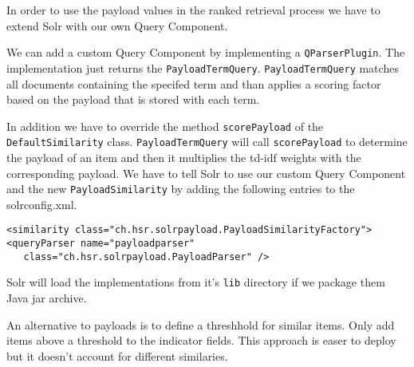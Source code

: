 In order to use the payload values in the ranked retrieval process we have to extend Solr with our own Query Component. 

We can add a custom Query Component by implementing a \verb|QParserPlugin|. The implementation just returns the \verb|PayloadTermQuery|. \verb|PayloadTermQuery| matches all documents containing the specifed term and than applies a scoring factor based on the payload that is stored with each term.

In addition we have to override the method \verb|scorePayload| of the \\ \verb|DefaultSimilarity| class. \verb|PayloadTermQuery| will call \verb|scorePayload| to determine the payload of an item and then it multiplies the td-idf weights with the corresponding payload. We have to tell Solr to use our custom Query Component and the new \verb|PayloadSimilarity| by adding the following entries to the solrconfig.xml.

\begin{lstlisting}
<similarity class="ch.hsr.solrpayload.PayloadSimilarityFactory">
<queryParser name="payloadparser" 
   class="ch.hsr.solrpayload.PayloadParser" />
\end{lstlisting}
  
Solr will load the implementations from it's \verb|lib| directory if we package them Java jar archive.

An alternative to payloads is to define a threshhold for similar items. Only add items above a threshold to the indicator fields. This approach is easer to deploy but it doesn't account for different similaries.